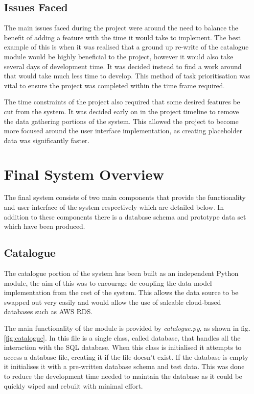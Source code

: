 \documentclass[12pt,titlepage]{article}
\begin{document}
  \subsection{Issues Faced}

  The main issues faced during the project were around the need to balance the
  benefit of adding a feature with the time it would take to implement. The best
  example of this is when it was realised that a ground up re-write of the
  catalogue module would be highly beneficial to the project, however it would
  also take several days of development time. It was decided instead to find a
  work around that would take much less time to develop. This method of task
  prioritisation was vital to ensure the project was completed within the
  time frame required.

  The time constraints of the project also required that some desired features
  be cut from the system. It was decided early on in the project timeline to
  remove the data gathering portions of the system. This allowed the project to
  become more focused around the user interface implementation, as creating
  placeholder data was significantly faster.

\section{Final System Overview}

  The final system consists of two main components that provide the
  functionality and user interface of the system respectively which are detailed
  below. In addition to these components there is a database schema and
  prototype data set which have been produced.

  \subsection{Catalogue}

  The catalogue portion of the system has been built as an independent Python
  module, the aim of this was to encourage de-coupling the data model
  implementation from the rest of the system. This allows the data source to be
  swapped out very easily and would allow the use of saleable cloud-based
  databases such as AWS RDS.

  The main functionality of the module is provided by \textit{catalogue.py}, as
  shown in fig. \ref{fig:catalogue}. In this file is a single class, called database,
  that handles all the interaction with the SQL database. When this class is
  initialised it attempts to access a database file, creating it if the file
  doesn't exist. If the database is empty it initialises it with a pre-written
  database schema and test data. This was done to reduce the development time
  needed to maintain the database as it could be quickly wiped and rebuilt with
  minimal effort.
\end{document}
